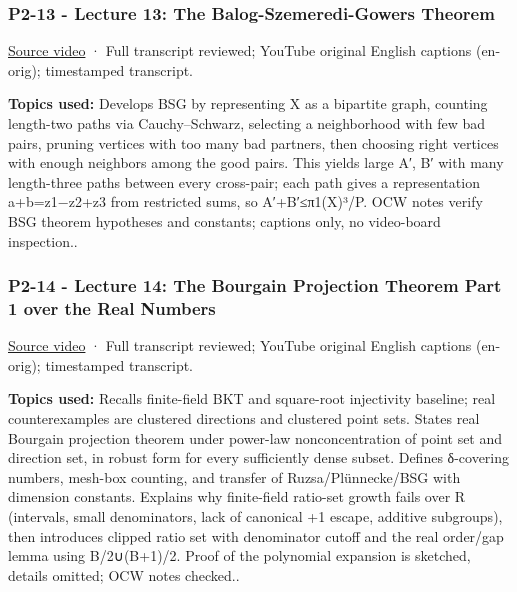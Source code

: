 \subsubsection{P2-13 - Lecture 13: The Balog-Szemeredi-Gowers Theorem}\label{04-visual-computing-ii-ch036-p2-13---lecture-13-the-balog-szemeredi-gowers-theorem}

\hypertarget{04-visual-computing-ii-ch036-p2-13---lecture-13-the-balog-szemeredi-gowers-theorem}{}

\href{https://www.youtube.com/watch?v=DGBuM5pEdoo}{Source video} · Full transcript reviewed; YouTube original English captions (en-orig); timestamped transcript.

\textbf{Topics used:} Develops BSG by representing X as a bipartite graph, counting length-two paths via Cauchy--Schwarz, selecting a neighborhood with few bad pairs, pruning vertices with too many bad partners, then choosing right vertices with enough neighbors among the good pairs. This yields large A′, B′ with many length-three paths between every cross-pair; each path gives a representation a+b=z1−z2+z3 from restricted sums, so \textbar A′+B′\textbar≤\textbar π1(X)\textbar³/P. OCW notes verify BSG theorem hypotheses and constants; captions only, no video-board inspection..

\subsubsection{P2-14 - Lecture 14: The Bourgain Projection Theorem Part 1 over the Real Numbers}\label{04-visual-computing-ii-ch036-p2-14---lecture-14-the-bourgain-projection-theorem-part-1-over-the-real-numbers}

\hypertarget{04-visual-computing-ii-ch036-p2-14---lecture-14-the-bourgain-projection-theorem-part-1-over-the-real-numbers}{}

\href{https://www.youtube.com/watch?v=0UYCJ0cjG9k}{Source video} · Full transcript reviewed; YouTube original English captions (en-orig); timestamped transcript.

\textbf{Topics used:} Recalls finite-field BKT and square-root injectivity baseline; real counterexamples are clustered directions and clustered point sets. States real Bourgain projection theorem under power-law nonconcentration of point set and direction set, in robust form for every sufficiently dense subset. Defines δ-covering numbers, mesh-box counting, and transfer of Ruzsa/Plünnecke/BSG with dimension constants. Explains why finite-field ratio-set growth fails over R (intervals, small denominators, lack of canonical +1 escape, additive subgroups), then introduces clipped ratio set with denominator cutoff and the real order/gap lemma using B/2∪(B+1)/2. Proof of the polynomial expansion is sketched, details omitted; OCW notes checked..

